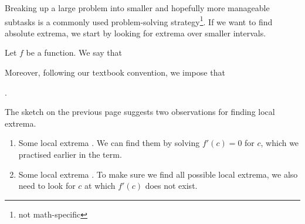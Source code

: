 \documentclass[../main.tex]{subfiles}
\begin{document}
\clearpage

Breaking up a large problem into smaller and hopefully more manageable subtasks is a commonly used problem-solving strategy\footnote{not math-specific}.  If we want to find absolute extrema, we start by looking for extrema over smaller intervals.

\begin{center}
  

\end{center}

\begin{definition}
  Let \(f\) be a function. We say that


  Moreover, following our textbook convention, we impose that 
  \begin{center}
    .
  \end{center}

\end{definition}
\bigskip

\begin{center}
  
\end{center}
\blanks*
\clearpage

The sketch on the previous page suggests two observations for finding local extrema.

\begin{enumerate}
  \item Some local extrema . We can find them by solving \(f'(c) = 0\) for \(c\), which we practised earlier in the term.

  \item Some local extrema . To make sure we find all possible local extrema, we also need to look for \(c\) at which \(f'(c)\) does not exist.
\end{enumerate}
\end{document}
